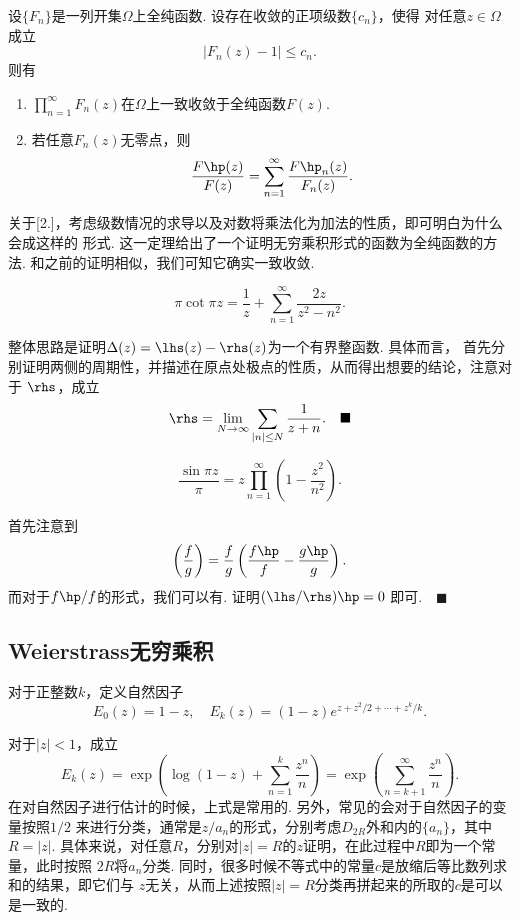   \begin{thm}
    \label{thm: 无穷乘积、导数}
    设$\{F_n\}$是一列开集$\Omega$上全纯函数. 设存在收敛的正项级数$\{c_n\}$，使得
    对任意$z\in\Omega$成立
    \[
      |F_n(z) - 1| \le c_n.
    \]
    则有
    \begin{enumerate}
      \item $\prod_{n=1}^\infty F_n(z)$在$\Omega$上一致收敛于全纯函数$F(z)$.
      \item 若任意$F_n(z)$无零点，则
        \[
          \frac{F\hp(z)}{F(z)} = \sum_{n=1}^\infty\frac{F\hp_n(z)}{F_n(z)}.
        \]
    \end{enumerate}
  \end{thm}
  \remark
    关于[2.]，考虑级数情况的求导以及对数将乘法化为加法的性质，即可明白为什么会成这样的
    形式. 这一定理给出了一个证明无穷乘积形式的函数为全纯函数的方法.
  \proof
    和之前的证明相似，我们可知它确实一致收敛.     

  \begin{thm}
    \label{thm: cot级数展开}
    \[
      \pi\cot\pi z=\frac{1}{z}+\sum_{n=1}^\infty\frac{2z}{z^2-n^2}.
    \]
  \end{thm}
  \proof
    整体思路是证明$\Delta(z) = \lhs(z) -  \rhs(z)$为一个有界整函数. 具体而言，
    首先分别证明两侧的周期性，并描述在原点处极点的性质，从而得出想要的结论，注意对于
    $\rhs$，成立
    \[
      \rhs = \lim_{N\to\infty}\sum_{|n|\le N}\frac{1}{z+n}. \quad\blacksquare
    \]

  \begin{thm}
    \[
      \frac{\sin\pi z}{\pi} = z\prod_{n=1}^\infty\left(1-\frac{z^2}{n^2}\right).
    \]
  \end{thm}
  \proof
    首先注意到
    \[
      \left(\frac{f}{g}\right) = \frac{f}{g}
      \left( \frac{f\hp}{f} - \frac{g\hp}{g} \right).
    \]
    而对于$f\hp/f$的形式，我们可以有. 证明$(\lhs/\rhs)\hp=0$
    即可.$\quad\blacksquare$


\subsection{Weierstrass无穷乘积}

  \begin{defi}[自然因子]
    对于正整数$k$，定义自然因子
    \[
      E_0(z) =1-z,\quad E_k(z)=(1-z)e^{z+z^2/2+\cdots+z^k/k}.
    \]
  \end{defi}
  \remark
    对于$|z|<1$，成立
    \[
      E_k(z) = \exp\left(\log(1-z)+\sum_{n=1}^k\frac{z^n}{n}\right)
      = \exp\left(\sum_{n=k+1}^\infty\frac{z^n}{n}\right).
    \]
    在对自然因子进行估计的时候，上式是常用的. 另外，常见的会对于自然因子的变量按照$1/2$
    来进行分类，通常是$z/a_n$的形式，分别考虑$D_{2R}$外和内的$\{a_n\}$，其中$R=|z|$.
    具体来说，对任意$R$，分别对$|z|=R$的$z$证明，在此过程中$R$即为一个常量，此时按照
    $2R$将$a_n$分类.  同时，很多时候不等式中的常量$c$是放缩后等比数列求和的结果，即它们与
    $z$无关，从而上述按照$|z|=R$分类再拼起来的所取的$c$是可以是一致的.

